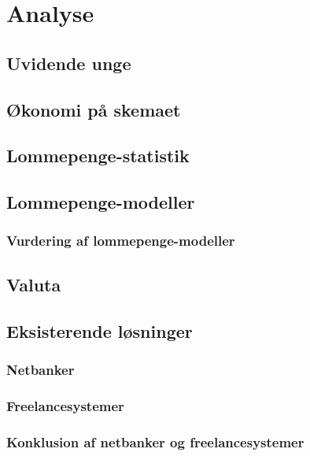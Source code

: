 \chapter{Analyse}

\section{Uvidende unge}
\label{UvidendeUnge}

\section{Økonomi på skemaet}
\label{Okonomi}

\section{Lommepenge-statistik}
\label{LommeStat}

\section{Lommepenge-modeller}
\label{LommeModeller}
\subsection{Vurdering af lommepenge-modeller}
\label{ModelVurdering}

\section{Valuta}
\label{Valuta}

\section{Eksisterende løsninger}
\subsection{Netbanker}
\subsection{Freelancesystemer}
\subsection{Konklusion af netbanker og freelancesystemer}
\label{DelkonklusionNetFree}

